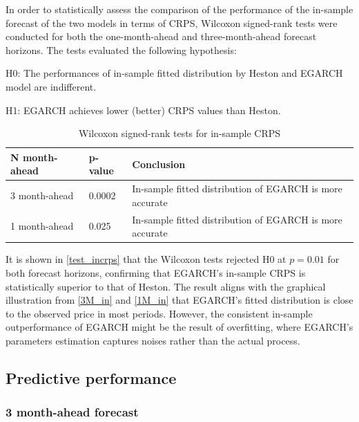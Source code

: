 \documentclass[12pt,a4paper]{article}
\newcommand\colorAutoref[1]{{\hypersetup{linkcolor=black}\autoref{#1}}}
\numberwithin{equation}{section}
\begin{document}
In order to statistically assess the comparison of the performance of the in-sample forecast of the two models in terms of CRPS, Wilcoxon signed-rank tests were conducted for both the one-month-ahead and three-month-ahead forecast horizons. The tests evaluated the following hypothesis:

H0: The performances of in-sample fitted distribution by Heston and EGARCH model are indifferent.

H1:  EGARCH achieves lower (better) CRPS values than Heston.

\begin{table}[h!]
\centering
\begin{tabular}{@{}lll@{}}
\toprule
N month-ahead     & p-value & Conclusion                     \\ \midrule
3 month-ahead     & 0.0002  & In-sample fitted distribution of EGARCH is more accurate \\
1 month-ahead     & 0.025    & In-sample fitted distribution of EGARCH is more accurate \\ \bottomrule
\end{tabular}
\caption{Wilcoxon signed-rank tests for in-sample CRPS}
\label{test_incrps}
\end{table}

It is shown in \colorAutoref{test_incrps} that the Wilcoxon tests rejected H0 at $p = 0.01$ for both forecast horizons, confirming that EGARCH’s in-sample CRPS is statistically superior to that of Heston. The result aligns with the graphical illustration from \colorAutoref{3M_in} and \colorAutoref{1M_in} that EGARCH's fitted distribution is close to the observed price in most periods. However, the consistent in-sample outperformance of EGARCH might be the result of overfitting, where EGARCH's parameters estimation captures noises rather than the actual process.

\subsection{Predictive performance}

\subsubsection{3 month-ahead forecast}
\end{document}
